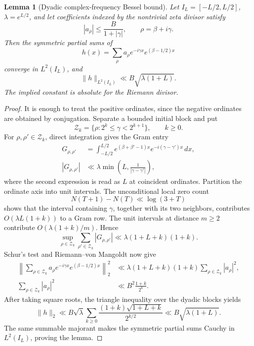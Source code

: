 \documentclass[11pt]{amsart}
\newtheorem{lemma}[theorem]{Lemma}
\theoremstyle{definition}
\theoremstyle{remark}
\begin{document}
\begin{lemma}[Dyadic complex-frequency Bessel bound]
\label{lem:dyadic-complex-bessel}
Let \(I_L=[-L/2,L/2]\), \(\lambda=e^{L/2}\), and let coefficients indexed
by the nontrivial zeta divisor satisfy
\[
 |a_\rho|\le \frac{B}{1+|\gamma|},
 \qquad \rho=\beta+i\gamma .
\tag{8.8af}
\]
Then the symmetric partial sums of
\[
 h(x)=\sum_\rho a_\rho
 e^{-i\gamma x}e^{(\beta-1/2)x}
\tag{8.8ag}
\]
converge in \(L^2(I_L)\), and
\[
 \boxed{\|h\|_{L^2(I_L)}
 \ll B\sqrt{\lambda(1+L)}.}
\tag{8.8ah}
\]
The implied constant is absolute for the Riemann divisor.
\end{lemma}

\begin{proof}
It is enough to treat the positive ordinates, since the negative ordinates
are obtained by conjugation.  Separate a bounded initial block and put
\[
 \mathcal Z_k=\{\rho:2^k\le\gamma<2^{k+1}\},
 \qquad k\ge0.
\tag{8.8ai}
\]
For \(\rho,\rho'\in\mathcal Z_k\), direct integration gives the Gram
entry
\[
 \begin{aligned}
 G_{\rho,\rho'}
 &=\int_{-L/2}^{L/2}
 e^{(\beta+\beta'-1)x}e^{-i(\gamma-\gamma')x}\,dx,\\
 |G_{\rho,\rho'}|
 &\ll\lambda\min\!\left(L,
 \frac1{|\gamma-\gamma'|}\right),
 \end{aligned}
\tag{8.8aj}
\]
where the second expression is read as \(L\) at coincident ordinates.
Partition the ordinate axis into unit intervals.  The unconditional local
zero count
\[
 N(T+1)-N(T)\ll\log(3+T)
\tag{8.8ak}
\]
shows that the interval containing \(\gamma\), together with its two
neighbors, contributes \(O(\lambda L(1+k))\) to a Gram row.  The unit
intervals at distance \(m\ge2\) contribute
\(O(\lambda(1+k)/m)\).  Hence
\[
 \sup_{\rho\in\mathcal Z_k}
 \sum_{\rho'\in\mathcal Z_k}|G_{\rho,\rho'}|
 \ll\lambda(1+L+k)(1+k).
\tag{8.8al}
\]
Schur's test and Riemann--von Mangoldt now give
\[
 \begin{aligned}
 \left\|\sum_{\rho\in\mathcal Z_k}a_\rho
 e^{-i\gamma x}e^{(\beta-1/2)x}\right\|_2^2
 &\ll\lambda(1+L+k)(1+k)
       \sum_{\rho\in\mathcal Z_k}|a_\rho|^2,\\
 \sum_{\rho\in\mathcal Z_k}|a_\rho|^2
 &\ll B^2\frac{1+k}{2^k}.
 \end{aligned}
\tag{8.8am}
\]
After taking square roots, the triangle inequality over the dyadic blocks
yields
\[
 \|h\|_2
 \ll B\sqrt\lambda
 \sum_{k\ge0}
 \frac{(1+k)\sqrt{1+L+k}}{2^{k/2}}
 \ll B\sqrt{\lambda(1+L)}.
\tag{8.8an}
\]
The same summable majorant makes the symmetric partial sums Cauchy in
\(L^2(I_L)\), proving the lemma.
\end{proof}
\end{document}

